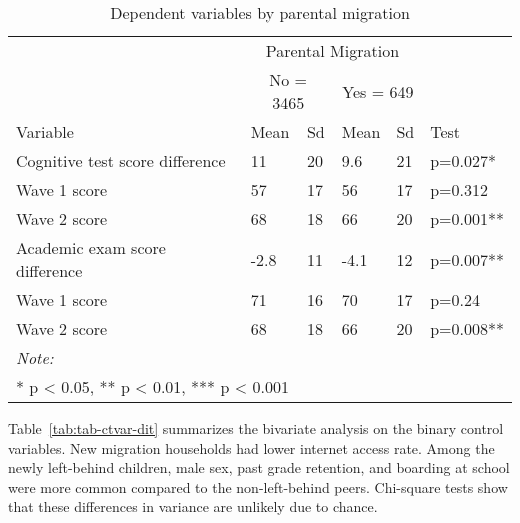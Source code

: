 \documentclass[
  man,floatsintext]{apa7}
\begin{document}
\begin{table}

\caption{\label{tab:tab-dpvar}Dependent variables by parental migration}
\centering
\begin{tabular}[t]{llllll}
\toprule
\multicolumn{1}{c}{ } & \multicolumn{4}{c}{Parental Migration} \\
\cmidrule(l{3pt}r{3pt}){2-5}
\multicolumn{1}{c}{ } & \multicolumn{2}{c}{No = 3465} & \multicolumn{2}{c}{Yes = 649} \\
\cmidrule(l{3pt}r{3pt}){2-3} \cmidrule(l{3pt}r{3pt}){4-5}
Variable & Mean & Sd & Mean & Sd & Test\\
\midrule
Cognitive test score difference & 11 & 20 & 9.6 & 21 & p=0.027*\\
\hspace{1em}Wave 1 score & 57 & 17 & 56 & 17 & p=0.312\\
\hspace{1em}Wave 2 score & 68 & 18 & 66 & 20 & p=0.001**\\
Academic exam score difference & -2.8 & 11 & -4.1 & 12 & p=0.007**\\
\hspace{1em}Wave 1 score & 71 & 16 & 70 & 17 & p=0.24\\
\addlinespace
\hspace{1em}Wave 2 score & 68 & 18 & 66 & 20 & p=0.008**\\
\bottomrule
\multicolumn{6}{l}{\rule{0pt}{1em}\textit{Note: }}\\
\multicolumn{6}{l}{\rule{0pt}{1em}* p < 0.05, ** p < 0.01, *** p < 0.001}\\
\end{tabular}
\end{table}

\newpage

Table~\ref{tab:tab-ctvar-dit} summarizes the bivariate analysis on the binary control variables. New migration households had lower internet access rate. Among the newly left-behind children, male sex, past grade retention, and boarding at school were more common compared to the non-left-behind peers. Chi-square tests show that these differences in variance are unlikely due to chance.
\end{document}
